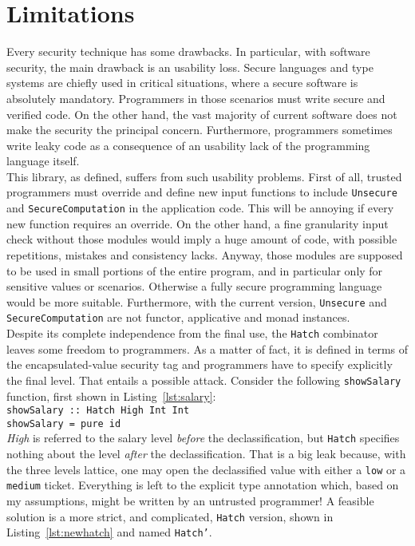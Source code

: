 \section{Limitations} \label{sec:limitations}
Every security technique has some drawbacks. In particular, with software security, the main drawback is an usability loss. Secure languages and type systems are chiefly used in critical situations, where a secure software is absolutely mandatory. Programmers in those scenarios must write secure and verified code. On the other hand, the vast majority of current software does not make the security the principal concern. Furthermore, programmers sometimes write leaky code as a consequence of an usability lack of the programming language itself. \\
This library, as defined, suffers from such usability problems. First of all, trusted programmers must override and define new input functions to include \texttt{Unsecure} and \texttt{SecureComputation} in the application code. This will be annoying if every new function requires an override. On the other hand, a fine granularity input check without those modules would imply a huge amount of code, with possible repetitions, mistakes and consistency lacks. Anyway, those modules are supposed to be used in small portions of the entire program, and in particular only for sensitive values or scenarios. Otherwise a fully secure programming language would be more suitable. Furthermore, with the current version, \texttt{Unsecure} and \texttt{SecureComputation} are not functor, applicative and monad instances. \\
Despite its complete independence from the final use, the \texttt{Hatch} combinator leaves some freedom to programmers. As a matter of fact, it is defined in terms of the encapsulated-value security tag and programmers have to specify explicitly the final level. That entails a possible attack. Consider the following \texttt{showSalary} function, first shown in Listing~\ref{lst:salary}: \\ \texttt{showSalary :: Hatch High Int Int\\showSalary = pure id} \\
\textit{High} is referred to the salary level \textit{before} the declassification, but \texttt{Hatch} specifies nothing about the level \textit{after} the declassification. That is a big leak because, with the three levels lattice, one may open the declassified value with either a \texttt{low} or a \texttt{medium} ticket. Everything is left to the explicit type annotation which, based on my assumptions, might be written by an untrusted programmer! A feasible solution is a more strict, and complicated, \texttt{Hatch} version, shown in Listing~\ref{lst:newhatch} and named \texttt{Hatch'}.
